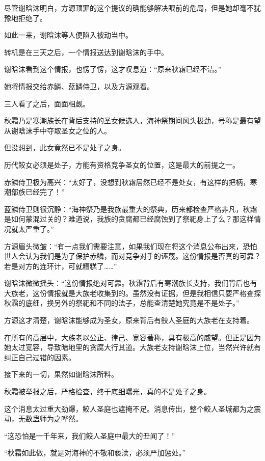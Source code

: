 
\begin{this_body}

尽管谢晗沫明白，方源顶罪的这个提议的确能够解决眼前的危局，但是她却毫不犹豫地拒绝了。

如此一来，谢晗沫等人便陷入被动当中。

转机是在三天之后，一个情报送达到谢晗沫的手中。

谢晗沫看到这个情报，也愣了愣，这才叹息道：“原来秋霜已经不洁。”

她将情报交给赤鳞、蓝鳞侍卫，以及方源观看。

三人看了之后，面面相觑。

秋霜乃是寒潮族长在背后支持的圣女候选人，海神祭期间风头极劲，号称是最有望从谢晗沫手中夺取圣女之位的人。

但没想到，此女竟然已不是处子之身。

历代鲛女必须是处子，方能有资格竞争圣女的位置，这是最大的前提之一。

赤鳞侍卫极为高兴：“太好了，没想到秋霜居然已经不是处女，有这样的把柄，寒潮部族已经完了！”

蓝鳞侍卫则很沉静：“海神祭乃是我族最重大的祭典，历来都检查严格非凡，秋霜是如何蒙混过关的？难道说，我族的贪腐都已经腐蚀到了祭祀身上了么？那这样情况就太严重了。”

方源眉头微皱：“有一点我们需要注意，如果我们现在将这个消息公布出来，恐怕世人会认为我们是为了保护赤鳞，而对竞争对手的诬蔑。这份情报是否真的可靠？若是对方的连环计，可就糟糕了……”

谢晗沫微微摇头：“这份情报绝对可靠。秋霜背后有寒潮族长支持，我们背后也有大族老，这份情报就是大族老收集到的。虽然没有证据，但是我相信只要严格查探秋霜的底细，换另外的祭祀和不同的法子，总能查清楚她究竟是不是处子。”

方源这才清楚，谢晗沫能够成为圣女，原来背后有鲛人圣庭的大族老在支持着。

在所有的高层中，大族老以公正、律己、宽容著称，具有极高的威望。但正是因为她太过宽容，导致暗地里的贪腐大行其道。大族老支持谢晗沫上位，当然兴许就有纠正自己过错的因素。

接下来的一切，果然如谢晗沫所料。

秋霜被举报之后，严格检查，终于底细曝光，真的不是处子之身。

这个消息太过重大劲爆，鲛人圣庭也遮掩不足。消息传出，整个鲛人圣城都为之震动，无数蛊师为之哗然。

“这恐怕是一千年来，我们鲛人圣庭中最大的丑闻了！”

“秋霜如此做，就是对海神的不敬和亵渎，必须严加惩处。”


\end{this_body}
